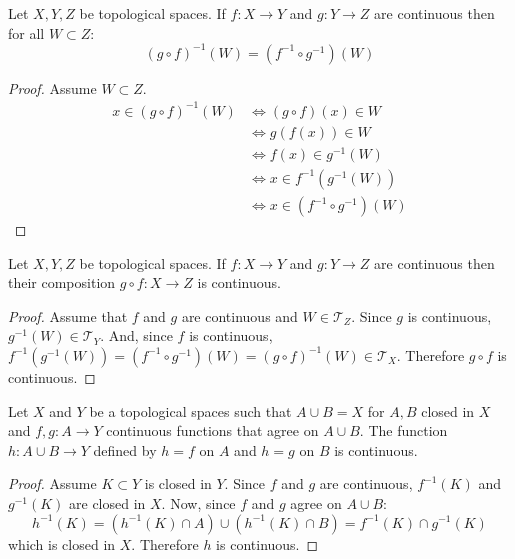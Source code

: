\documentclass[letterpaper,12pt,fleqn]{article}
\newcommand{\T}{\mathscr{T}}
\begin{document}
\begin{lemma}
  Let \(X,Y,Z\) be topological spaces.  If \(f:X\to Y\) and \(g:Y\to Z\) are continuous then for all
  \(W\subset Z\):
  \[(g\circ f)^{-1}(W)=(f^{-1}\circ g^{-1})(W)\]
\end{lemma}

\begin{proof}
  Assume \(W\subset Z\).
  \begin{align*}
    x\in(g\circ f)^{-1}(W) &\iff (g\circ f)(x)\in W \\
    &\iff g(f(x))\in W \\
    &\iff f(x)\in g^{-1}(W) \\
    &\iff x\in f^{-1}(g^{-1}(W)) \\
    &\iff x\in (f^{-1}\circ g^{-1})(W)
  \end{align*}
\end{proof}

\begin{theorem}[7.9]
  Let \(X,Y,Z\) be topological spaces.  If \(f:X\to Y\) and \(g:Y\to Z\) are continuous then their composition
  \(g\circ f:X\to Z\) is continuous.
\end{theorem}

\begin{proof}
  Assume that \(f\) and \(g\) are continuous and \(W\in\T_Z\).  Since \(g\) is continuous, \(g^{-1}(W)\in\T_Y\).
  And, since \(f\) is continuous, \(f^{-1}(g^{-1}(W))=(f^{-1}\circ g^{-1})(W)=(g\circ f)^{-1}(W)\in\T_X\).
  Therefore \(g\circ f\) is continuous.
\end{proof}

\begin{theorem}[7.10]
  Let \(X\) and \(Y\) be a topological spaces such that \(A\cup B=X\) for \(A,B\) closed in \(X\) and \(f,g:A\to Y\)
  continuous functions that agree on \(A\cup B\).  The function \(h:A\cup B\to Y\) defined by \(h=f\) on \(A\) and
  \(h=g\) on \(B\) is continuous.
\end{theorem}

\begin{proof}
  Assume \(K\subset Y\) is closed in \(Y\).  Since \(f\) and \(g\) are continuous, \(f^{-1}(K)\) and \(g^{-1}(K)\)
  are closed in \(X\).  Now, since \(f\) and \(g\) agree on \(A\cup B\):
  \[h^{-1}(K)=(h^{-1}(K)\cap A)\cup(h^{-1}(K)\cap B)=f^{-1}(K)\cap g^{-1}(K)\]
  which is closed in \(X\).  Therefore \(h\) is continuous.
\end{proof}
\end{document}
